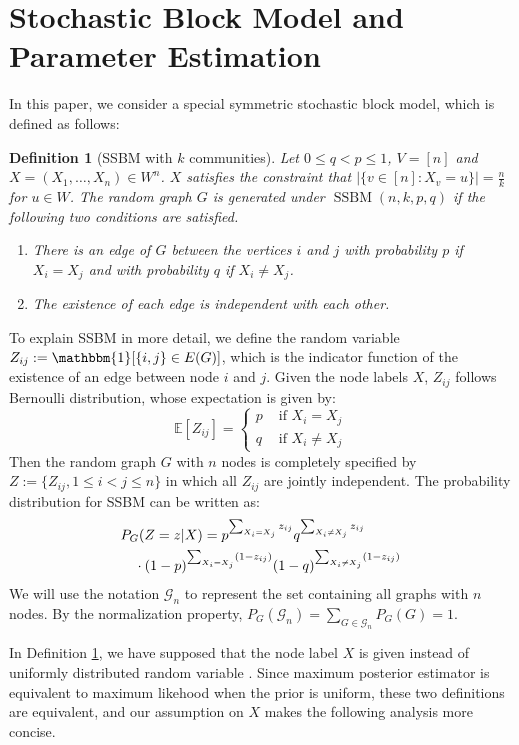 \documentclass[journal]{IEEEtran}
\newtheorem{definition}{Definition}
\newcommand{\cG}{\mathcal{G}}
\newcommand{\1}{\mathbbm{1}}
\DeclareMathOperator{\SSBM}{SSBM}
\begin{document}
\section{Stochastic Block Model and Parameter Estimation}\label{sec:psbm}
In this paper, we consider a special symmetric stochastic block model, which is defined as follows:
	\begin{definition}[SSBM with $k$ communities] \label{def:SSBM}
	Let $0\leq q<p\leq 1$, $V=[n]$ and $X=(X_1,\dots,X_n)\in W^n$. $X$ satisfies the constraint that $|\{v \in [n] : X_v = u\}| = \frac{n}{k}$ for $u\in W$.
	The random graph $G$ is generated under $\SSBM(n,k,p,q)$ if the following two conditions are satisfied.
	\begin{enumerate}
	\item There is an edge of $G$ between the vertices $i$ and $j$ with probability $p$ if $X_i=X_j$ and with probability $q$ if $X_i \neq X_j$.
	\item The existence of each edge is independent with each other.
	\end{enumerate}
\end{definition}
To explain SSBM in more detail,
we define the random variable $Z_{ij}:=\mathbbm{1}[\{i,j\} \in E(G)]$, which is the indicator function of the existence of an edge between node $i$ and $j$.
Given the node labels $X$, $Z_{ij}$ follows Bernoulli distribution, whose expectation is given by:
\begin{equation}
\mathbb{E}[Z_{ij}] =
\begin{cases}
p & \textrm{ if } X_i = X_j \\ 
q & \textrm{ if }  X_i \neq X_j
\end{cases}
\end{equation}
Then the random graph $G$ with $n$ nodes
is completely specified by $Z:=\{Z_{ij}, 1\leq i<j\leq n\}$ in which all $Z_{ij}$ are jointly independent.
The probability distribution for SSBM can be written as:
\begin{align}
&P_G(Z = z| X) = p^{\sum_{X_i = X_j} z_{ij}}q^{\sum_{X_i \neq X_j} z_{ij}} \notag \\
&\quad \cdot (1-p)^{\sum_{X_i = X_j} (1-z_{ij})}(1-q)^{\sum_{X_i \neq X_j} (1-z_{ij})} \label{eq:GmL}
\end{align}
We will use the notation $\cG_n$ to represent the set containing all graphs with $n$ nodes. By the normalization property,
$P_G(\cG_n) = \sum_{G\in \cG_n}P_G(G)=1$.

In Definition \ref{def:SSBM}, we have supposed that the node label $X$ is given instead of uniformly distributed random variable
. Since maximum posterior estimator is equivalent to maximum likehood when the prior is uniform,
these two definitions are equivalent, and our assumption on $X$ makes the following analysis more concise.
\end{document}
